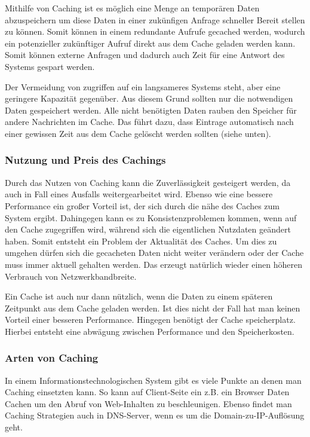 Mithilfe von Caching ist es möglich eine Menge an temporären Daten abzuspeichern um diese Daten in einer zukünfigen Anfrage schneller Bereit stellen zu können. Somit können in einem redundante Aufrufe gecached werden, wodurch ein potenzieller zukünftiger Aufruf direkt aus dem Cache geladen werden kann. Somit können externe Anfragen und dadurch auch Zeit für eine Antwort des Systems gespart werden. %

Der Vermeidung von zugriffen auf ein langsameres Systems steht, aber eine geringere Kapazität gegenüber. Aus diesem Grund sollten nur die notwendigen Daten gespeichert werden. Alle nicht benötigten Daten rauben den Speicher für andere Nachrichten im Cache. Das führt dazu, dass Eintrage automatisch nach einer gewissen Zeit aus dem Cache gelöscht werden sollten (siehe unten). %

\subsubsection{Nutzung und Preis des Cachings}

Durch das Nutzen von Caching kann die Zuverlässigkeit gesteigert werden, da auch in Fall eines Ausfalls weitergearbeitet wird. Ebenso wie eine bessere Performance ein großer Vorteil ist, der sich durch die nähe des Caches zum System ergibt. Dahingegen kann es zu Konsistenzproblemen kommen, wenn auf den Cache zugegriffen wird, während sich die eigentlichen Nutzdaten geändert haben. Somit entsteht ein Problem der Aktualität des Caches. Um dies zu umgehen dürfen sich die gecacheten Daten nicht weiter verändern oder der Cache muss immer aktuell gehalten werden. Das erzeugt natürlich wieder einen höheren Verbrauch von Netzwerkbandbreite.  %

Ein Cache ist auch nur dann nützlich, wenn die Daten zu einem späteren Zeitpunkt aus dem Cache geladen werden. Ist dies nicht der Fall hat man keinen Vorteil einer besseren Performance. Hingegen benötigt der Cache speicherplatz. Hierbei entsteht eine abwägung zwischen Performance und den Speicherkosten. %

\subsubsection{Arten von Caching}

In einem Informationstechnologischen System gibt es viele Punkte an denen man Caching einsetzten kann. So kann auf Client-Seite ein z.B. ein Browser Daten Cachen um den Abruf von Web-Inhalten zu beschleunigen. Ebenso findet man Caching Strategien auch in DNS-Server, wenn es um die Domain-zu-IP-Auflösung geht. %

